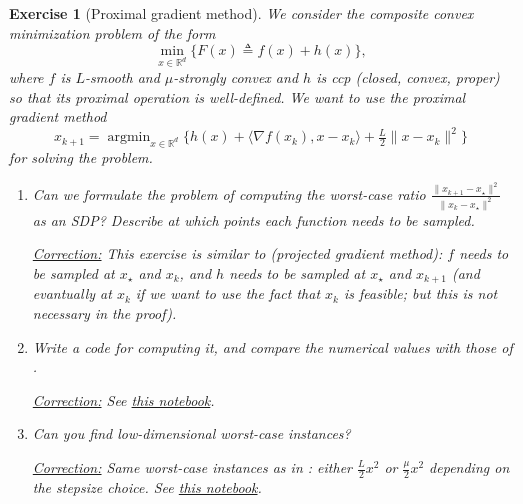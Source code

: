 \documentclass[11pt,a4paper]{article}
\newcommand{\inner}[2]{{\langle #1, #2\rangle}}
\DeclareMathOperator*{\argmin}{argmin}
\newcommand{\correction}[1]{{{\color{blue}\underline{Correction:} #1}}}
\newcommand{\correction}[1]{}
\newtheorem{exercise}{Exercise}
\begin{document}
	\begin{exercise}[Proximal gradient method]\label{ex:pgm} We consider the composite convex minimization problem of the form
	\[ \min_{x\in\mathbb{R}^d} \{F(x)\triangleq f(x)+h(x)\},\]
where $f$ is $L$-smooth and $\mu$-strongly convex and $h$ is ccp (closed, convex, proper) so that its proximal operation is well-defined. We want to use the proximal gradient method
\[ x_{k+1}=\argmin_{x\in\mathbb{R}^d}\{h(x)+\inner{\nabla f(x_k)}{x-x_k}+\tfrac{L}{2}\|x-x_k\|^2\}\]
for solving the problem.
	\begin{enumerate}
	\item Can we formulate the problem of computing the worst-case ratio $\frac{\|x_{k+1}-x_\star\|^2}{\|x_k-x_\star\|^2}$ as an SDP? Describe at which points each function needs to be sampled. 
	
	\correction{This exercise is similar to  (projected gradient method): $f$ needs to be sampled at $x_\star$ and $x_k$, and $h$ needs to be sampled at $x_\star$ and $x_{k+1}$ (and evantually at $x_k$ if we want to use the fact that $x_k$ is feasible; but this is not necessary in the proof).}
	
	\item Write a code for computing it, and compare the numerical values with those of .
	
	\correction{See \href{https://github.com/PerformanceEstimation/Learning-Performance-Estimation/tree/main/Codes/Jupyter/Exercise09.ipynb}{this notebook}.}
	
	\item Can you find low-dimensional worst-case instances?
	
	\correction{Same worst-case instances as in : either $\tfrac{L}{2}x^2$ or $\tfrac{\mu}{2}x^2$ depending on the stepsize choice. See \href{https://github.com/PerformanceEstimation/Learning-Performance-Estimation/tree/main/Codes/Jupyter/Exercise09.ipynb}{this notebook}.}
	\end{enumerate}
	\end{exercise}
\end{document}
